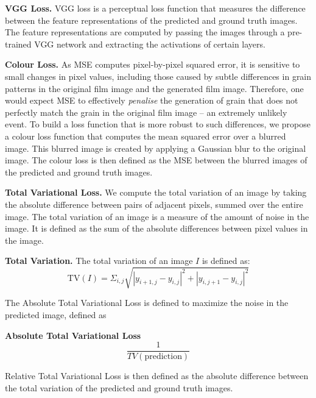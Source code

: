 \textbf{VGG Loss.} VGG loss is a perceptual loss function that measures the difference between the feature representations of the predicted and ground truth images. The feature representations are computed by passing the images through a pre-trained VGG network and extracting the activations of certain layers. 


\textbf{Colour Loss.} As MSE computes pixel-by-pixel squared error, it is sensitive to small changes in pixel values, including those caused by subtle differences in grain patterns in the original film image and the generated film image. Therefore, one would expect MSE to effectively \textit{penalise} the generation of grain that does not perfectly match the grain in the original film image -- an extremely unlikely event. To build a loss function that is more robust to such differences, we propose a colour loss function that computes the mean squared error over a blurred image. This blurred image is created by applying a Gaussian blur to the original image. The colour loss is then defined as the MSE between the blurred images of the predicted and ground truth images. 

\textbf{Total Variational Loss.} We compute the total variation of an image by taking the absolute difference between pairs of adjacent pixels, summed over the entire image. The total variation of an image is a measure of the amount of noise in the image. It is defined as the sum of the absolute differences between pixel values in the image. 

\begin{definition}
    \textbf{Total Variation.} The total variation of an image $I$ is defined as:
    \begin{equation}
        \text{TV}(I) = \Sigma_{i,j}\sqrt{|y_{i+1,j} - y_{i,j}|^2 + |y_{i,j+1} - y_{i,j}|^2}
    \end{equation}
\end{definition}

The Absolute Total Variational Loss is defined to maximize the noise in the predicted image, defined as 

\begin{definition}
  \textbf{Absolute Total Variational Loss}
\begin{equation}
  \frac{1}{TV(\text{prediction})}
\end{equation}
\end{definition}

Relative Total Variational Loss is then defined as the absolute difference between the total variation of the predicted and ground truth images.

